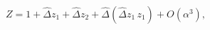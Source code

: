 \begin{equation}
Z = 1+\hat\Delta z_1+\hat\Delta z_2+\hat\Delta(\hat\Delta z_1\, z_1)
+O(\alpha^3),
\end{equation}

